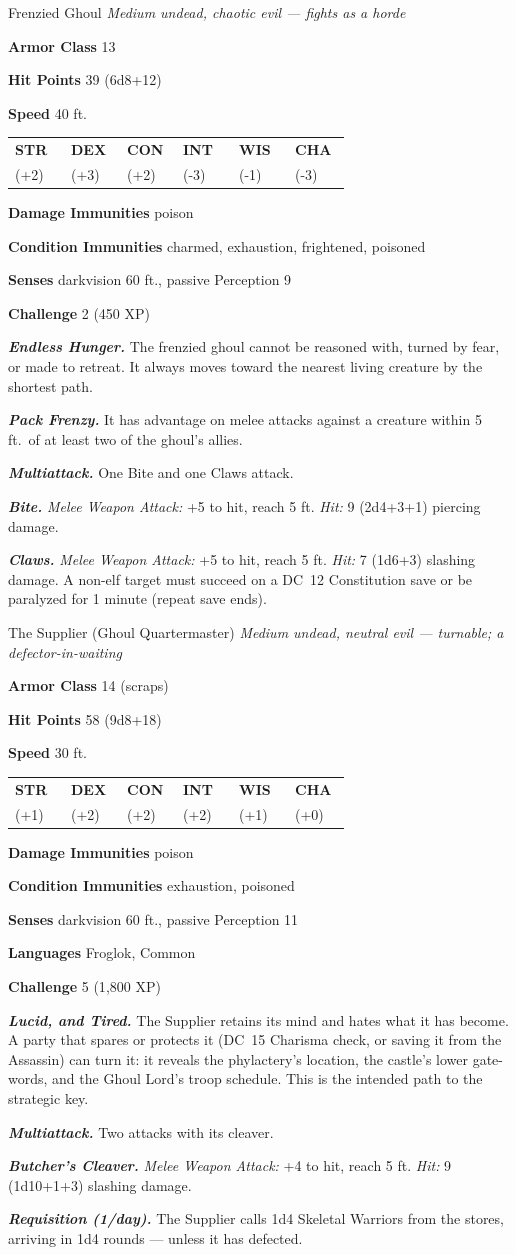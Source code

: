 \documentclass[10pt,twoside]{report}
\makeatletter
\newcommand{\msub}[1]{{\itshape #1}\par}
\newcommand{\mrule}{\par\vspace{2pt}{\color{gukred}\rule{\linewidth}{1.1pt}}\par\vspace{2pt}}
\newcommand{\mthin}{\par\vspace{1pt}{\color{gukred!60}\rule{\linewidth}{0.5pt}}\par\vspace{2pt}}
\newcommand{\mfield}[2]{\noindent\textbf{\color{gukred}#1} #2\par}
\newcommand{\mhead}[1]{\par\smallskip{\sffamily\bfseries\scshape\color{gukred}#1}\par
  \vspace{-3pt}{\color{gukred}\rule{\linewidth}{0.7pt}}\par\vspace{2pt}}
\newcommand{\mtrait}[2]{\noindent\textbf{\itshape #1} #2\par\vspace{2pt}}
\newcommand{\abilities}[6]{\par\smallskip\noindent
  {\setlength{\tabcolsep}{1.5pt}%
  \begin{tabular}{@{}*{6}{p{0.15\linewidth}}@{}}
  \centering\sffamily\bfseries\color{gukred}STR &\centering\sffamily\bfseries\color{gukred}DEX
  &\centering\sffamily\bfseries\color{gukred}CON &\centering\sffamily\bfseries\color{gukred}INT
  &\centering\sffamily\bfseries\color{gukred}WIS &\centering\arraybackslash\sffamily\bfseries\color{gukred}CHA\\
  \centering #1 &\centering #2 &\centering #3 &\centering #4 &\centering #5 &\centering\arraybackslash #6\\
  \end{tabular}}\par\smallskip}
\newcommand{\dc}[1]{DC~#1}
\makeatother
\begin{document}
\begin{statblock}{Frenzied Ghoul}
\msub{Medium undead, chaotic evil --- \textnormal{fights as a horde}}
\mrule
\mfield{Armor Class}{13}
\mfield{Hit Points}{39 (6d8+12)}
\mfield{Speed}{40 ft.}
\abilities{14 (+2)}{16 (+3)}{14 (+2)}{5 (-3)}{8 (-1)}{5 (-3)}
\mthin
\mfield{Damage Immunities}{poison}
\mfield{Condition Immunities}{charmed, exhaustion, frightened, poisoned}
\mfield{Senses}{darkvision 60 ft., passive Perception 9}
\mfield{Challenge}{2 (450 XP)}
\mrule
\mtrait{Endless Hunger.}{The frenzied ghoul cannot be reasoned with, turned by fear, or made to retreat. It always moves toward the nearest living creature by the shortest path.}
\mtrait{Pack Frenzy.}{It has advantage on melee attacks against a creature within 5 ft.\ of at least two of the ghoul's allies.}
\mhead{Actions}
\mtrait{Multiattack.}{One Bite and one Claws attack.}
\mtrait{Bite.}{\textit{Melee Weapon Attack:} +5 to hit, reach 5 ft. \textit{Hit:} 9 (2d4+3+1) piercing damage.}
\mtrait{Claws.}{\textit{Melee Weapon Attack:} +5 to hit, reach 5 ft. \textit{Hit:} 7 (1d6+3) slashing damage. A non-elf target must succeed on a \dc{12} Constitution save or be paralyzed for 1 minute (repeat save ends).}
\end{statblock}

\begin{statblock}{The Supplier (Ghoul Quartermaster)}
\msub{Medium undead, neutral evil --- \textnormal{turnable; a defector-in-waiting}}
\mrule
\mfield{Armor Class}{14 (scraps)}
\mfield{Hit Points}{58 (9d8+18)}
\mfield{Speed}{30 ft.}
\abilities{13 (+1)}{14 (+2)}{15 (+2)}{15 (+2)}{12 (+1)}{11 (+0)}
\mthin
\mfield{Damage Immunities}{poison}
\mfield{Condition Immunities}{exhaustion, poisoned}
\mfield{Senses}{darkvision 60 ft., passive Perception 11}
\mfield{Languages}{Froglok, Common}
\mfield{Challenge}{5 (1{,}800 XP)}
\mrule
\mtrait{Lucid, and Tired.}{The Supplier retains its mind and hates what it has become. A party that spares or protects it (\dc{15} Charisma check, or saving it from the Assassin) can turn it: it reveals the phylactery's location, the castle's lower gate-words, and the Ghoul Lord's troop schedule. This is the intended path to the strategic key.}
\mhead{Actions}
\mtrait{Multiattack.}{Two attacks with its cleaver.}
\mtrait{Butcher's Cleaver.}{\textit{Melee Weapon Attack:} +4 to hit, reach 5 ft. \textit{Hit:} 9 (1d10+1+3) slashing damage.}
\mtrait{Requisition (1/day).}{The Supplier calls 1d4 Skeletal Warriors from the stores, arriving in 1d4 rounds --- unless it has defected.}
\end{statblock}
\end{document}
